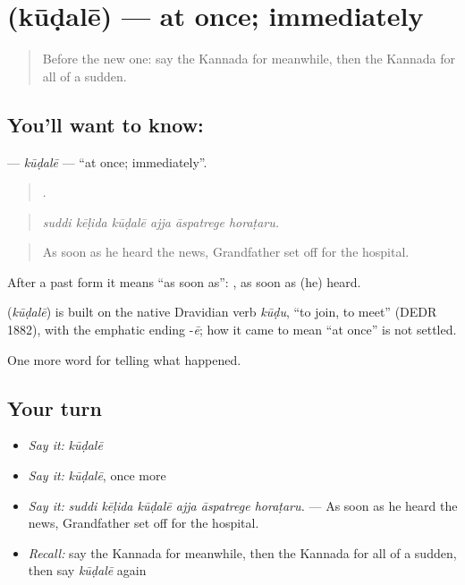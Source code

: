 \section[\texorpdfstring{\kn{ಕೂಡಲೇ} (kūḍalē)}{ಕೂಡಲೇ (kūḍalē)}]{ (kūḍalē) — at once; immediately}

\label{lesson:KA-C327-kudale}



\begin{quote}
Before the new one: say the Kannada for meanwhile, then the Kannada for all of a sudden.
\end{quote}

\subsection*{You'll want to know: }
\textbf{} — \emph{kūḍalē} — \textquotedblleft{}at once; immediately\textquotedblright{}.

\begin{quote}
     .
\end{quote}

\begin{quote}
\emph{suddi kēḷida kūḍalē ajja āspatrege horaṭaru.}
\end{quote}

\begin{quote}
As soon as he heard the news, Grandfather set off for the hospital.
\end{quote}

After a past form it means \textquotedblleft{}as soon as\textquotedblright{}:  , as soon as (he) heard.

\begin{cousinweb}
\textbf{} (\emph{kūḍalē}) is built on the native Dravidian verb \emph{kūḍu}, \textquotedblleft{}to join, to meet\textquotedblright{} (DEDR 1882), with the emphatic ending -\emph{ē}; how it came to mean \textquotedblleft{}at once\textquotedblright{} is not settled.
\end{cousinweb}

\begin{grammarlens}[title={What you've built}]
One more word for telling what happened.
\end{grammarlens}

\subsection*{Your turn}
\begin{itemize}
\raggedright
  \item \emph{Say it:} \emph{kūḍalē}
  \item \emph{Say it:} \emph{kūḍalē}, once more
  \item \emph{Say it:} \emph{suddi kēḷida kūḍalē ajja āspatrege horaṭaru.} — As soon as he heard the news, Grandfather set off for the hospital.
  \item \emph{Recall:} say the Kannada for meanwhile, then the Kannada for all of a sudden, then say \emph{kūḍalē} again
\end{itemize}

